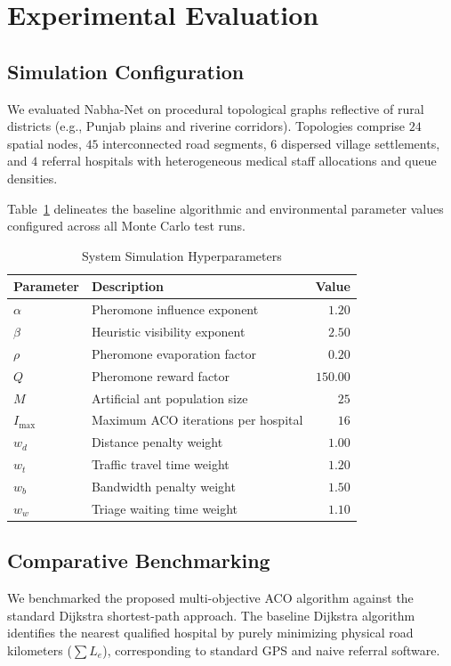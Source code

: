 \documentclass[conference]{IEEEtran}
\begin{document}
\section{Experimental Evaluation}

\subsection{Simulation Configuration}
We evaluated Nabha-Net on procedural topological graphs reflective of rural districts (e.g., Punjab plains and riverine corridors). Topologies comprise $24$ spatial nodes, $45$ interconnected road segments, $6$ dispersed village settlements, and $4$ referral hospitals with heterogeneous medical staff allocations and queue densities.

Table~\ref{tab:parameters} delineates the baseline algorithmic and environmental parameter values configured across all Monte Carlo test runs.

\begin{table}[htbp]
\caption{System Simulation Hyperparameters}
\begin{center}
\begin{tabular}{llr}
\toprule
\textbf{Parameter} & \textbf{Description} & \textbf{Value} \\
\midrule
$\alpha$ & Pheromone influence exponent & $1.20$ \\
$\beta$ & Heuristic visibility exponent & $2.50$ \\
$\rho$ & Pheromone evaporation factor & $0.20$ \\
$Q$ & Pheromone reward factor & $150.00$ \\
$M$ & Artificial ant population size & $25$ \\
$I_{\max}$ & Maximum ACO iterations per hospital & $16$ \\
$w_d$ & Distance penalty weight & $1.00$ \\
$w_t$ & Traffic travel time weight & $1.20$ \\
$w_b$ & Bandwidth penalty weight & $1.50$ \\
$w_w$ & Triage waiting time weight & $1.10$ \\
\bottomrule
\end{tabular}
\label{tab:parameters}
\end{center}
\end{table}

\subsection{Comparative Benchmarking}
We benchmarked the proposed multi-objective ACO algorithm against the standard Dijkstra shortest-path approach. The baseline Dijkstra algorithm identifies the nearest qualified hospital by purely minimizing physical road kilometers ($\sum L_e$), corresponding to standard GPS and naive referral software.
\end{document}
